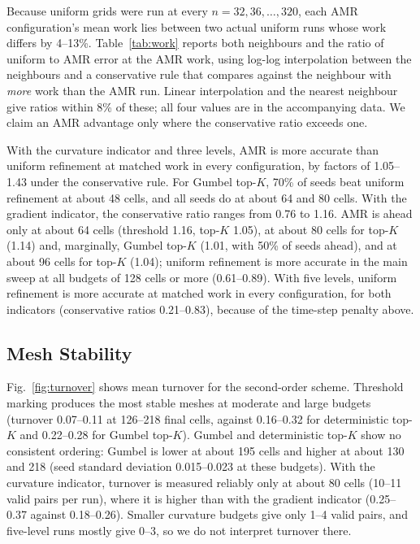 \documentclass[conference]{IEEEtran}
\begin{document}
Because uniform grids were run at every $n = 32, 36, \ldots, 320$, each AMR configuration's mean work lies between two actual uniform runs whose work differs by 4--13\%. Table~\ref{tab:work} reports both neighbours and the ratio of uniform to AMR error at the AMR work, using log-log interpolation between the neighbours and a conservative rule that compares against the neighbour with \emph{more} work than the AMR run. Linear interpolation and the nearest neighbour give ratios within 8\% of these; all four values are in the accompanying data. We claim an AMR advantage only where the conservative ratio exceeds one.

With the curvature indicator and three levels, AMR is more accurate than uniform refinement at matched work in every configuration, by factors of 1.05--1.43 under the conservative rule. For Gumbel top-$K$, 70\% of seeds beat uniform refinement at about 48 cells, and all seeds do at about 64 and 80 cells. With the gradient indicator, the conservative ratio ranges from 0.76 to 1.16. AMR is ahead only at about 64 cells (threshold 1.16, top-$K$ 1.05), at about 80 cells for top-$K$ (1.14) and, marginally, Gumbel top-$K$ (1.01, with 50\% of seeds ahead), and at about 96 cells for top-$K$ (1.04); uniform refinement is more accurate in the main sweep at all budgets of 128 cells or more (0.61--0.89). With five levels, uniform refinement is more accurate at matched work in every configuration, for both indicators (conservative ratios 0.21--0.83), because of the time-step penalty above.

\begin{table}[t]
\caption{Work-matched comparison with uniform refinement (second-order scheme, three levels). Uniform below/above: the actual uniform runs whose work brackets the AMR work. Errors in units of $10^{-3}$. Ratio: uniform error divided by AMR error, by log-log interpolation and by the conservative rule (uniform run with more work); a value above one favours AMR. Gumbel top-$K$: brackets give the share of seeds more accurate than uniform at their own work.}
\label{tab:work}
\centering
\resizebox{\textwidth}{!}{}
\end{table}

\subsection{Mesh Stability}

Fig.~\ref{fig:turnover} shows mean turnover for the second-order scheme. Threshold marking produces the most stable meshes at moderate and large budgets (turnover 0.07--0.11 at 126--218 final cells, against 0.16--0.32 for deterministic top-$K$ and 0.22--0.28 for Gumbel top-$K$). Gumbel and deterministic top-$K$ show no consistent ordering: Gumbel is lower at about 195 cells and higher at about 130 and 218 (seed standard deviation 0.015--0.023 at these budgets). With the curvature indicator, turnover is measured reliably only at about 80 cells (10--11 valid pairs per run), where it is higher than with the gradient indicator (0.25--0.37 against 0.18--0.26). Smaller curvature budgets give only 1--4 valid pairs, and five-level runs mostly give 0--3, so we do not interpret turnover there.
\end{document}
